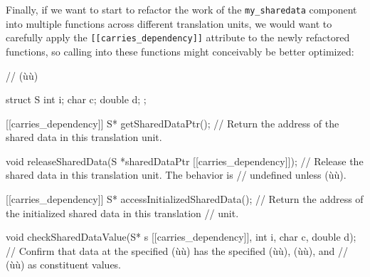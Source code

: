 \noindent Finally, if we want to start to refactor the work of
the \lstinline!my_sharedata! component into multiple
 functions across different
translation units, we would want to carefully apply the
\lstinline![[carries_dependency]]! attribute to the newly refactored
functions, so calling into these functions might conceivably be better
optimized:

%
%
\begin{emcppslisting}
// (ù{}ù)

struct S
{
    int    i;
    char   c;
    double d;
};

[[carries_dependency]] S* getSharedDataPtr();
    // Return the address of the shared data in this translation unit.

void releaseSharedData(S *sharedDataPtr [[carries_dependency]]);
    // Release the shared data in this translation unit.  The behavior is
    // undefined unless (ù{}ù).

[[carries_dependency]] S* accessInitializedSharedData();
    // Return the address of the initialized shared data in this translation
    // unit.

void checkSharedDataValue(S* s [[carries_dependency]],
                          int    i,
                          char   c,
                          double d);
    // Confirm that data at the specified (ù{}ù) has the specified (ù{}ù), (ù{}ù), and
    // (ù{}ù) as constituent values.
\end{emcppslisting}
\newpage%
